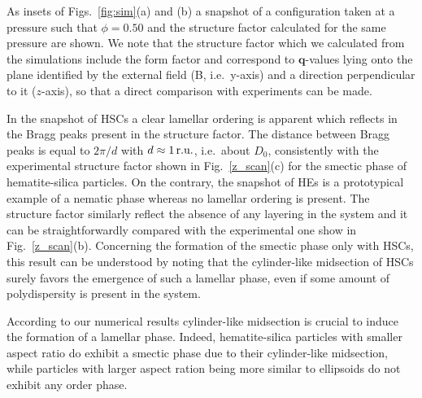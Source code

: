 \documentclass[aps,prl,preprint,superscriptaddress]{revtex4-1} %
\begin{document}
As insets of Figs.~\ref{fig:sim}(a) and (b) a snapshot of a configuration
taken at a pressure such that $\phi=0.50$ and the structure factor 
calculated for the same pressure are shown.  We note that the structure factor which we calculated from the simulations
include the form factor and correspond to $\mathbf{q}$-values lying onto the plane identified by the external field (B, i.e.~y-axis) and a direction perpendicular
to it ($z$-axis), so that a direct comparison with experiments can be made.

In the snapshot of HSCs a clear lamellar ordering is apparent which reflects in the Bragg peaks present in the structure factor.
The distance between Bragg peaks is equal to $2\pi/d$ with $d\approx 1\,\hbox{r.u.}$, i.e.~about $D_0$, consistently with the experimental structure
factor shown in Fig.~\ref{z_scan}(c) for the smectic phase of hematite-silica particles.
On the contrary, the snapshot of HEs is a prototypical example of a nematic phase
whereas no lamellar ordering is present. The structure factor similarly reflect the absence of any layering in the system and it can 
be straightforwardly compared with the experimental one show in Fig.~\ref{z_scan}(b). 
Concerning the formation of the smectic phase only with HSCs, this result can be understood by noting
that the cylinder-like midsection of HSCs surely favors the emergence of such a lamellar phase,
even if some amount of polydispersity is present in the system. 

According to our numerical results cylinder-like midsection is crucial to induce the formation of a lamellar phase. 
Indeed, hematite-silica particles with smaller aspect ratio do exhibit a smectic phase due to their cylinder-like midsection,
while particles with larger aspect ration being more similar to ellipsoids do not exhibit any order phase.
\end{document}
